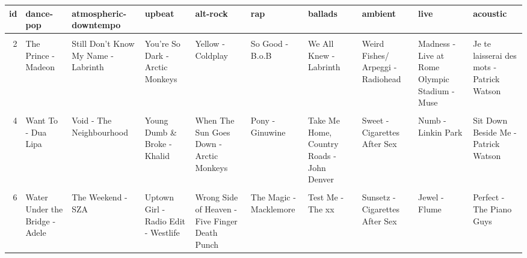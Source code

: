 \documentclass[
]{article}
\begin{document}
\begin{table}
\centering
\begin{tabular}{r|l|l|l|l|l|l|l|l|l}
\hline
id & dance-pop & atmospheric-downtempo & upbeat & alt-rock & rap & ballads & ambient & live & acoustic\\
\hline
\cellcolor{gray!6}{1} & \cellcolor{gray!6}{Toxicity - System Of A Down} & \cellcolor{gray!6}{Take Me Out - Franz Ferdinand} & \cellcolor{gray!6}{Under The Influence - Chris Brown} & \cellcolor{gray!6}{Thought Contagion - Muse} & \cellcolor{gray!6}{No Role Modelz - J. Cole} & \cellcolor{gray!6}{Wasteland, Baby! - Hozier} & \cellcolor{gray!6}{When the Sun Hits - Slowdive} & \cellcolor{gray!6}{Mequetrefe - Arca} & \cellcolor{gray!6}{Suspirium - Thom Yorke}\\
\hline
2 & The Prince - Madeon & Still Don't Know My Name - Labrinth & You're So Dark - Arctic Monkeys & Yellow - Coldplay & So Good - B.o.B & We All Knew - Labrinth & Weird Fishes/ Arpeggi - Radiohead & Madness - Live at Rome Olympic Stadium - Muse & Je te laisserai des mots - Patrick Watson\\
\hline
\cellcolor{gray!6}{3} & \cellcolor{gray!6}{Why Are Sundays So Depressing - The Strokes} & \cellcolor{gray!6}{Wait - M83} & \cellcolor{gray!6}{You Only Live Once - The Strokes} & \cellcolor{gray!6}{The Adults Are Talking - The Strokes} & \cellcolor{gray!6}{tell me it's okay - gnash} & \cellcolor{gray!6}{The Game of Love - Daft Punk} & \cellcolor{gray!6}{Spectre - Radiohead} & \cellcolor{gray!6}{Waiting for the End - Linkin Park} & \cellcolor{gray!6}{Unmade - Thom Yorke}\\
\hline
4 & Want To - Dua Lipa & Void - The Neighbourhood & Young Dumb \& Broke - Khalid & When The Sun Goes Down - Arctic Monkeys & Pony - Ginuwine & Take Me Home, Country Roads - John Denver & Sweet - Cigarettes After Sex & Numb - Linkin Park & Sit Down Beside Me - Patrick Watson\\
\hline
\cellcolor{gray!6}{5} & \cellcolor{gray!6}{W.D.Y.W.F.M? - The Neighbourhood} & \cellcolor{gray!6}{Who Will Save You Now - Les Friction} & \cellcolor{gray!6}{Why'd You Only Call Me When You're High? - Arctic Monkeys} & \cellcolor{gray!6}{Unstoppable - Sia} & \cellcolor{gray!6}{Roaring 20s - Panic! At The Disco} & \cellcolor{gray!6}{The Heart of Life - John Mayer} & \cellcolor{gray!6}{While We Sleep - Insomnium} & \cellcolor{gray!6}{Stronger - Kanye West} & \cellcolor{gray!6}{Interlude 2 - Poppy}\\
\hline
6 & Water Under the Bridge - Adele & The Weekend - SZA & Uptown Girl - Radio Edit - Westlife & Wrong Side of Heaven - Five Finger Death Punch & The Magic - Macklemore & Test Me - The xx & Sunsetz - Cigarettes After Sex & Jewel - Flume & Perfect - The Piano Guys\\

\end{tabular}
\end{table}
\end{document}
